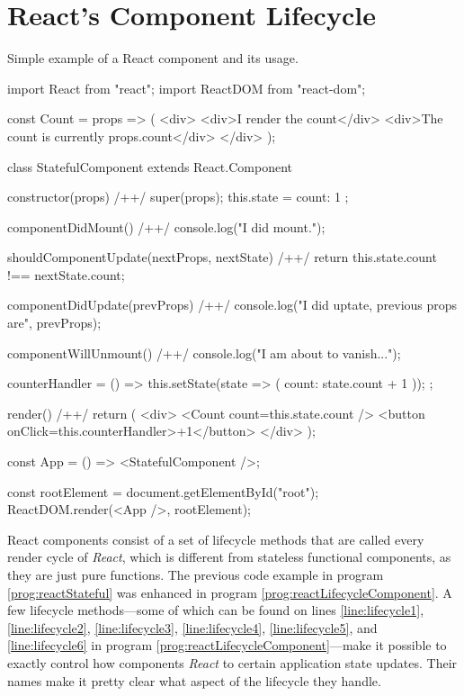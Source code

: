 
\section{React's Component Lifecycle}

\begin{program}
\caption{Simple example of a React component and its usage.} 
\label{prog:reactLifecycleComponent}
\begin{JsCode}
import React from "react";
import ReactDOM from "react-dom";

const Count = props => (
  <div>
    <div>I render the count</div>
    <div>The count is currently {props.count}</div>
  </div>
);

class StatefulComponent extends React.Component {
  constructor(props) { /+\label{line:lifecycle1}+/
    super(props);
    this.state = {
      count: 1
    };
  }

  componentDidMount() { /+\label{line:lifecycle2}+/
    console.log("I did mount.");
  }

  shouldComponentUpdate(nextProps, nextState) { /+\label{line:lifecycle3}+/
    return this.state.count !== nextState.count;
  }

  componentDidUpdate(prevProps) { /+\label{line:lifecycle4}+/
    console.log("I did uptate, previous props are", prevProps);
  }

  componentWillUnmount() { /+\label{line:lifecycle5}+/
    console.log("I am about to vanish...");
  }

  counterHandler = () => {
    this.setState(state => ({ count: state.count + 1 }));
  };

  render() { /+\label{line:lifecycle6}+/
    return (
      <div>
        <Count count={this.state.count} />
        <button onClick={this.counterHandler}>+1</button>
      </div>
    );
  }
}
  
const App = () => <StatefulComponent />;

const rootElement = document.getElementById("root");
ReactDOM.render(<App />, rootElement);  
\end{JsCode}
\end{program}

React components consist of a set of lifecycle methods that are called every render cycle of \emph{React}, which is different from stateless functional components, as they are just pure functions. The previous code example in program \ref{prog:reactStateful} was enhanced in program \ref{prog:reactLifecycleComponent}. A few lifecycle methods---some of which can be found on lines \ref{line:lifecycle1}, \ref{line:lifecycle2}, \ref{line:lifecycle3}, \ref{line:lifecycle4}, \ref{line:lifecycle5}, and \ref{line:lifecycle6} in program \ref{prog:reactLifecycleComponent}---make it possible to exactly control how components \emph{React} to certain application state updates. Their names make it pretty clear what aspect of the lifecycle they handle.

